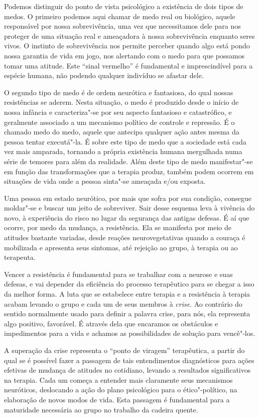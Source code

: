 Podemos distinguir do ponto de vista psicológico a existência de dois
tipos de medos. O primeiro podemos aqui chamar de medo real ou
biológico, aquele responsável por nossa sobrevivência, uma vez que
necessitamos dele para nos proteger de uma situação real e ameaçadora à
nossa sobrevivência enquanto seres vivos. O instinto de sobrevivência
nos permite perceber quando algo está pondo nossa garantia de vida em
jogo, nos alertando com o medo para que possamos tomar uma atitude. Este
``sinal vermelho'' é fundamental e imprescindível para a espécie humana,
não podendo qualquer indivíduo se afastar dele.

O segundo tipo de medo é de ordem neurótica e fantasiosa, do qual nossas
resistências se aderem. Nesta situação, o medo é produzido desde o
início de nossa infância e caracteriza"-se por seu aspecto fantasioso e
catastrófico, e geralmente associado a um mecanismo político de controle
e repressão. É o chamado medo do medo, aquele que antecipa qualquer ação
antes mesma da pessoa tentar executá"-la. É sobre este tipo de medo que a
sociedade está cada vez mais amparada, tornando a própria existência
humana mergulhada numa série de temores para além da realidade. Além
deste tipo de medo manifestar"-se em função das transformações que a
terapia produz, também podem ocorrem em situações de vida onde a pessoa
sinta"-se ameaçada e/ou exposta.

Uma pessoa em estado neurótico, por mais que sofra por sua condição,
consegue moldar"-se e buscar um jeito de sobreviver. Sair desse esquema
leva à vivência do novo, à experiência do risco no lugar da segurança
das antigas defesas. É aí que ocorre, por medo da mudança, a
resistência. Ela se manifesta por meio de atitudes bastante variadas,
desde reações neurovegetativas quando a couraça é mobilizada e apresenta
seus sintomas, até rejeição ao grupo, à terapia ou ao terapeuta.

Vencer a resistência é fundamental para se trabalhar com a neurose e
suas defesas, e vai depender da eficiência do processo terapêutico para
se chegar a isso da melhor forma. A luta que se estabelece entre terapia
e a resistência à terapia acabam levando o grupo e cada um de seus
membros à \emph{crise}. Ao contrário do sentido normalmente usado para
definir a palavra crise, para nós, ela representa algo positivo,
favorável. É através dela que encaramos os obstáculos e impedimentos
para a vida e achamos as possibilidades de solução para vencê"-los.

A superação da crise representa o ``ponto de viragem'' terapêutica, a
partir do qual se é possível fazer a passagem de tais entendimentos
diagnósticos para ações efetivas de mudança de atitudes no cotidiano,
levando a resultados significativos na terapia. Cada um começa a
entender mais claramente seus mecanismos neuróticos, deslocando a ação
do plano psicológico para o ético"-político, na elaboração de novos modos
de vida. Esta passagem é fundamental para a maturidade necessária ao
grupo no trabalho da cadeira quente.

